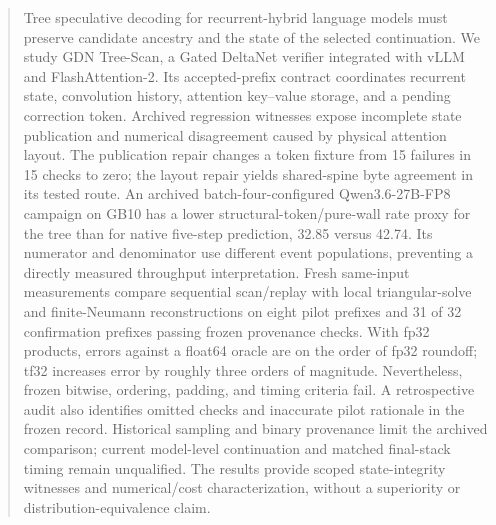 \begin{abstract}
Tree speculative decoding for recurrent-hybrid language models must preserve candidate ancestry and the state of the selected continuation. We study GDN Tree-Scan, a Gated DeltaNet verifier integrated with vLLM and FlashAttention-2. Its accepted-prefix contract coordinates recurrent state, convolution history, attention key--value storage, and a pending correction token. Archived regression witnesses expose incomplete state publication and numerical disagreement caused by physical attention layout. The publication repair changes a token fixture from 15 failures in 15 checks to zero; the layout repair yields shared-spine byte agreement in its tested route. An archived batch-four-configured Qwen3.6-27B-FP8 campaign on GB10 has a lower structural-token/pure-wall rate proxy for the tree than for native five-step prediction, 32.85 versus 42.74. Its numerator and denominator use different event populations, preventing a directly measured throughput interpretation. Fresh same-input measurements compare sequential scan/replay with local triangular-solve and finite-Neumann reconstructions on eight pilot prefixes and 31 of 32 confirmation prefixes passing frozen provenance checks. With fp32 products, errors against a float64 oracle are on the order of fp32 roundoff; tf32 increases error by roughly three orders of magnitude. Nevertheless, frozen bitwise, ordering, padding, and timing criteria fail. A retrospective audit also identifies omitted checks and inaccurate pilot rationale in the frozen record. Historical sampling and binary provenance limit the archived comparison; current model-level continuation and matched final-stack timing remain unqualified. The results provide scoped state-integrity witnesses and numerical/cost characterization, without a superiority or distribution-equivalence claim.
\end{abstract}
